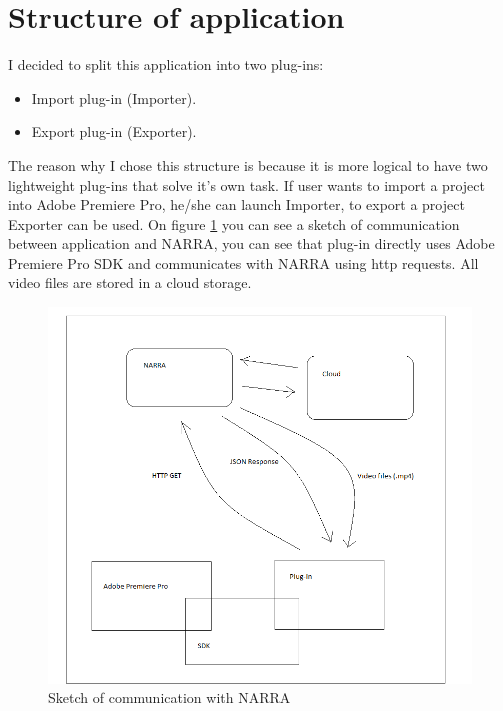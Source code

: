 \documentclass[thesis=B,english]{FITthesis}[2012/10/20]
\begin{document}
\section{Structure of application}
I decided to split this application into two plug-ins:
	\begin{itemize}
		\item Import plug-in (Importer).
		\item Export plug-in (Exporter).
	\end{itemize}
The reason why I chose this structure is because it is more logical to have two lightweight plug-ins that solve it's own task. If user wants to import a project into Adobe Premiere Pro, he/she can launch Importer, to export a project Exporter can be used. On figure \ref{fig:narrastruct} you can see a sketch of communication between application and NARRA, you can see that plug-in directly uses Adobe Premiere Pro SDK and communicates with NARRA using http requests. All video files are stored in a cloud storage.
	\begin{figure}
		\centering
		\includegraphics[width=1\textwidth]{StructureofNARRA.png}
		\caption{Sketch of communication with NARRA}\label{fig:narrastruct}
	\end{figure}
\end{document}
